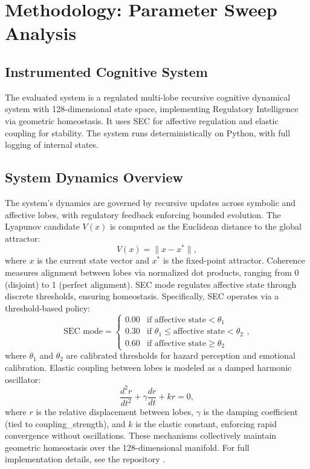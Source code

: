\documentclass[11pt,a4paper]{article}
\begin{document}
\section{Methodology: Parameter Sweep Analysis}

\subsection{Instrumented Cognitive System}

The evaluated system is a regulated multi-lobe recursive cognitive dynamical system with 128-dimensional state space, implementing Regulatory Intelligence via geometric homeostasis. It uses SEC for affective regulation and elastic coupling for stability. The system runs deterministically on Python, with full logging of internal states.

\subsection{System Dynamics Overview}

The system's dynamics are governed by recursive updates across symbolic and affective lobes, with regulatory feedback enforcing bounded evolution. The Lyapunov candidate \(V(x)\) is computed as the Euclidean distance to the global attractor:
\[
V(x) = \|x - x^*\|,
\]
where \(x\) is the current state vector and \(x^*\) is the fixed-point attractor. Coherence measures alignment between lobes via normalized dot products, ranging from 0 (disjoint) to 1 (perfect alignment). SEC mode regulates affective state through discrete thresholds, ensuring homeostasis. Specifically, SEC operates via a threshold-based policy:
\[
\text{SEC mode} = 
\begin{cases} 
0.00 & \text{if affective state} < \theta_1 \\
0.30 & \text{if } \theta_1 \leq \text{affective state} < \theta_2 \\
0.60 & \text{if affective state} \geq \theta_2 
\end{cases},
\]
where \(\theta_1\) and \(\theta_2\) are calibrated thresholds for hazard perception and emotional calibration. Elastic coupling between lobes is modeled as a damped harmonic oscillator:
\[
\frac{d^2 r}{dt^2} + \gamma \frac{dr}{dt} + k r = 0,
\]
where \(r\) is the relative displacement between lobes, \(\gamma\) is the damping coefficient (tied to coupling_strength), and \(k\) is the elastic constant, enforcing rapid convergence without oscillations. These mechanisms collectively maintain geometric homeostasis over the 128-dimensional manifold. For full implementation details, see the repository \cite{SpiralBrainV3}.
\end{document}
